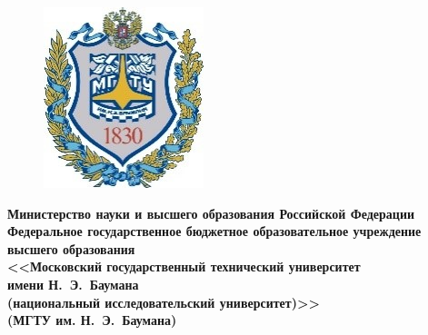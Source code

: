 \begin{titlepage}
	{\large %
	\onehalfspacing
	\centering

	\begin{figure}
		\vspace{3mm}
		\hspace{-10mm}
		\includegraphics[width=\linewidth]{img/b_logo}
	\end{figure}
	{\singlespacing \footnotesize \bfseries Министерство науки и высшего образования Российской Федерации\\Федеральное государственное бюджетное образовательное учреждение\\высшего образования\\<<Московский государственный технический университет\\имени Н.~Э.~Баумана\\ (национальный исследовательский университет)>>\\(МГТУ им. Н.~Э.~Баумана)\\}

	\vspace{-2.2mm}
	\vhrulefill{0.9mm}\\
	\vspace{-7.5mm}
	\vhrulefill{0.2mm}\\
	\vspace{2mm}

}
\end{titlepage}
